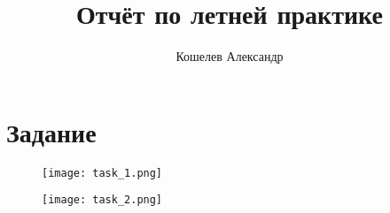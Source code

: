 \documentclass[0.1pt, cmcyralt]{article}
\title{Отчёт по летней практике}
\author{Кошелев Александр}
\begin{document}
\maketitle
\section{Задание}

	\begin{figure}[h]
	\centering
	\texttt{[image: task\_1.png]}
	\label{fig:mpr}
	\end{figure}

\begin{figure}[h]
    \centering
    \texttt{[image: task\_2.png]}
\end{figure}
\end{document}
